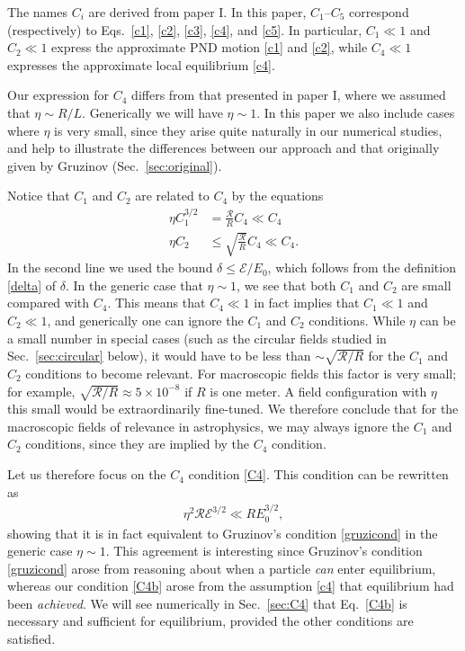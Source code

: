 \documentclass[amsmath,amssymb,nofootinbib,notitlepage,superscriptaddress,twocolumn]{revtex4-2}
\begin{document}
The names $C_i$ are derived from paper I.  In this paper, $C_1$--$C_5$ correspond (respectively) to Eqs.~\eqref{c1}, \eqref{c2}, \eqref{c3}, \eqref{c4}, and \eqref{c5}.   In particular, $C_1 \ll 1$ and $C_2 \ll 1$ express the approximate PND motion \eqref{c1} and \eqref{c2}, while $C_4\ll1$ expresses the approximate local equilibrium \eqref{c4}.

Our expression for $C_4$ differs from that presented in paper I, where we assumed that $\eta \sim R/L$.  Generically we will have $\eta \sim 1$.  In this paper we also include cases where $\eta$ is very small, since they arise quite naturally in our numerical studies, and help to illustrate the differences between our approach and that originally given by Gruzinov (Sec.~\ref{sec:original}). 

Notice that $C_1$ and $C_2$ are related to $C_4$ by the equations
\begin{align}
\eta C_1^{3/2} & = \frac{\mathcal{R}}{R} C_4 \ll C_4 \label{ic41} \\
\eta C_2 & \leq \sqrt{\frac{\mathcal{R}}{R}} C_4 \ll C_4. \label{ic42}
\end{align}
In the second line we used the bound $\delta \leq \mathcal{E}/E_0$, which follows from the definition \eqref{delta} of $\delta$.  In the generic case that $\eta\sim 1$, we see that both $C_1$ and $C_2$ are small compared with $C_4$.  This means that $C_4 \ll 1$ in fact implies that $C_1\ll 1$ and $C_2 \ll 1$, and generically one can ignore the $C_1$ and $C_2$ conditions.  While $\eta$ can be a small number in special cases (such as the circular fields studied in Sec.~\ref{sec:circular} below), it would have to be less than $\sim\sqrt{\mathcal{R}/R}$ for the $C_1$ and $C_2$ conditions to become relevant.  For macroscopic fields this factor is very small; for example, $\sqrt{\mathcal{R}/R}\approx 5\times10^{-8}$ if $R$ is one meter.  A field configuration with $\eta$ this small would be extraordinarily fine-tuned.  We therefore conclude that for the macroscopic fields of relevance in astrophysics, we may always ignore the $C_1$ and $C_2$ conditions, since they are implied by the $C_4$ condition.

Let us therefore focus on the $C_4$ condition \eqref{C4}.  This condition can be rewritten as
\begin{align}\label{C4b}
\eta^2 \mathcal{R} \mathcal{E}^{3/2} \ll R E_0^{3/2},
\end{align}
showing that it is in fact equivalent to Gruzinov's condition \eqref{gruzicond} in the generic case $\eta\sim 1$.  This agreement is interesting since Gruzinov's condition \eqref{gruzicond} arose from reasoning about when a particle \textit{can} enter equilibrium, whereas our condition \eqref{C4b} arose from the assumption \eqref{c4} that equilibrium had been \textit{achieved}.  We will see numerically in Sec.~\ref{sec:C4} that Eq.~\eqref{C4b} is necessary and sufficient for equilibrium, provided the other conditions are satisfied.
\end{document}

